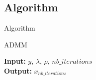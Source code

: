 \subsection{Algorithm}

\frame{
    \tableofcontents[ 
        currentsubsection, 
    ]
}

\begin{frame}{Algorithm}
\begin{algorithm}[H]
    \caption{ADMM} %
    \begin{algorithmic}[1]
        \newline
        \textbf{Input:} $y$, $\lambda$, $\rho$, $nb\_iterations$ \\
        \textbf{Output:} $x_{nb\_iterations}$
        \EndFor
        \EndProcedure
    \end{algorithmic}
\end{algorithm}
\end{frame}


